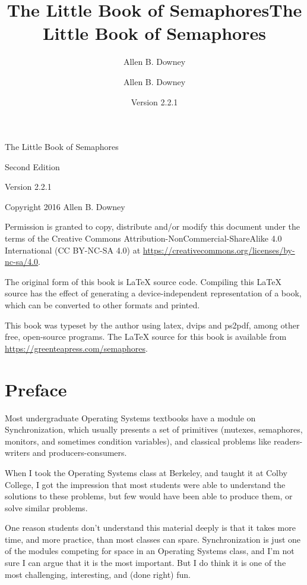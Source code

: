 \documentclass{book}
\title{The Little Book of Semaphores}
\author{Allen B. Downey}
\newcommand{\theversion}{Version 2.2.1}
\begin{document}
\title {The Little Book of Semaphores}
\author {Allen B. Downey}

\date {\theversion}
\maketitle

\vspace{2in}
\begin{center}
    {\Large The Little Book of Semaphores}

    Second Edition
    \vspace{0.25in}

    \theversion
    \vspace{0.25in}

    Copyright 2016 Allen B. Downey
\end{center}
\vspace{0.25in}

Permission is granted to copy, distribute and/or modify this document under the terms of the Creative Commons Attribution-NonCommercial-ShareAlike 4.0 International (CC BY-NC-SA 4.0) at \url{https://creativecommons.org/licenses/by-nc-sa/4.0}.

The original form of this book is LaTeX source code. Compiling this LaTeX source has the effect of generating a device-independent representation of a book, which can be converted to other formats and printed.

This book was typeset by the author using latex, dvips and ps2pdf, among other free, open-source programs. The LaTeX source for this book is available from \url{https://greenteapress.com/semaphores}.

\frontmatter

\chapter{Preface}

Most undergraduate Operating Systems textbooks have a module on Synchronization, which usually presents a set of primitives (mutexes, semaphores, monitors, and sometimes condition variables), and classical problems like readers-writers and producers-consumers.

When I took the Operating Systems class at Berkeley, and taught it at Colby College, I got the impression that most students were able to understand the solutions to these problems, but few would have been able to produce them, or solve similar problems.

One reason students don't understand this material deeply is that it takes more time, and more practice, than most classes can spare. Synchronization is just one of the modules competing for space in an Operating Systems class, and I'm not sure I can argue that it is the most important.  But I do think it is one of the most challenging, interesting, and (done right) fun.
\end{document}
